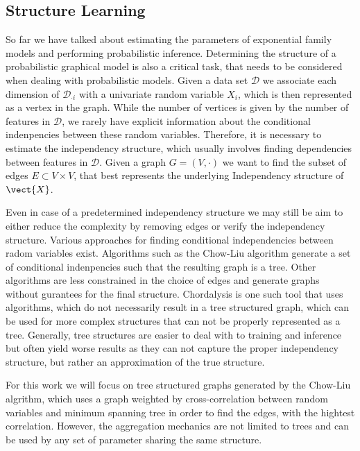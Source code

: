 \subsection{Structure Learning}

So far we have talked about estimating the parameters of exponential family models and performing probabilistic inference.
Determining the structure of a probabilistic graphical model is also a critical task, that needs to be considered when dealing with probabilistic models.
Given a data set $\mathcal{D}$ we associate each dimension of $\mathcal{D}_{\cdot i}$ with a univariate random variable $X_i$, which is then represented as a vertex in the graph.
While the number of vertices is given by the number of features in $\mathcal{D}$, we rarely have explicit information about the conditional indenpencies between these random variables. 
Therefore, it is necessary to estimate the independency structure, which usually involves finding dependencies between features in $\mathcal{D}$. 
Given a graph $G=(V, \cdot)$ we want to find the subset of edges $E \subset V \times V$, that best represents the underlying Independency structure of $\vect{X}$.

Even in case of a predetermined independency structure we may still be aim to either reduce the complexity by removing edges or verify the independency structure.
Various approaches for finding conditional independencies between radom variables exist.
Algorithms such as the Chow-Liu algorithm generate a set of conditional indenpencies such that the resulting graph is a tree.
Other algorithms are less constrained in the choice of edges and generate graphs without gurantees for the final structure.
Chordalysis is one such tool that uses algorithms, which do not necessarily result in a tree structured graph, which can be used for more complex structures that can not be properly represented as a tree. 
Generally, tree structures are easier to deal with \wrt to training and inference but often yield worse results as they can not capture the proper independency structure, but rather an approximation of the true structure.

For this work we will focus on tree structured graphs generated by the Chow-Liu algrithm, which uses a graph weighted by cross-correlation between random variables and minimum spanning tree in order to find the edges, with the hightest correlation.
However, the aggregation mechanics are not limited to trees and can be used by any set of parameter sharing the same structure.

